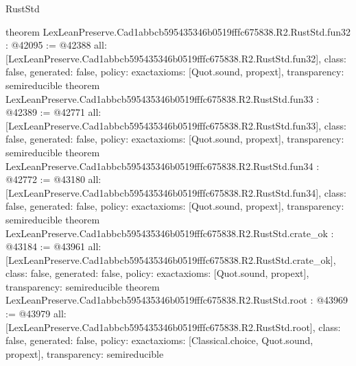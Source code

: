 \begin{lexlean}{RustStd}
\begin{coremodule}
{}
theorem LexLeanPreserve.Cad1abbcb595435346b0519fffc675838.R2.RustStd.fun32 : @42095 := @42388 {
  all: [LexLeanPreserve.Cad1abbcb595435346b0519fffc675838.R2.RustStd.fun32],
  class: false,
  generated: false,
  policy: exact{axioms: [Quot.sound, propext]},
  transparency: semireducible
}
theorem LexLeanPreserve.Cad1abbcb595435346b0519fffc675838.R2.RustStd.fun33 : @42389 := @42771 {
  all: [LexLeanPreserve.Cad1abbcb595435346b0519fffc675838.R2.RustStd.fun33],
  class: false,
  generated: false,
  policy: exact{axioms: [Quot.sound, propext]},
  transparency: semireducible
}
theorem LexLeanPreserve.Cad1abbcb595435346b0519fffc675838.R2.RustStd.fun34 : @42772 := @43180 {
  all: [LexLeanPreserve.Cad1abbcb595435346b0519fffc675838.R2.RustStd.fun34],
  class: false,
  generated: false,
  policy: exact{axioms: [Quot.sound, propext]},
  transparency: semireducible
}
theorem LexLeanPreserve.Cad1abbcb595435346b0519fffc675838.R2.RustStd.crate_ok : @43184 := @43961 {
  all: [LexLeanPreserve.Cad1abbcb595435346b0519fffc675838.R2.RustStd.crate_ok],
  class: false,
  generated: false,
  policy: exact{axioms: [Quot.sound, propext]},
  transparency: semireducible
}
theorem LexLeanPreserve.Cad1abbcb595435346b0519fffc675838.R2.RustStd.root : @43969 := @43979 {
  all: [LexLeanPreserve.Cad1abbcb595435346b0519fffc675838.R2.RustStd.root],
  class: false,
  generated: false,
  policy: exact{axioms: [Classical.choice, Quot.sound, propext]},
  transparency: semireducible
}


\end{coremodule}
\end{lexlean}
